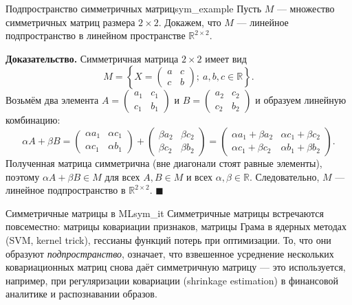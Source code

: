 \documentclass[12pt,a4paper]{article}
\newenvironment{myproof}{\noindent\textbf{Доказательство.}}{\hfill$\blacksquare$}
\begin{document}
\begin{definition}{Подпространство симметричных матриц}{sym_example}
Пусть $M$ — множество симметричных матриц размера $2 \times 2$.
Докажем, что $M$ — линейное подпространство в линейном пространстве
$\mathbb{R}^{2\times 2}$.
\end{definition}

\begin{myproof}
Симметричная матрица $2\times 2$ имеет вид
\[
M = \left\{ X =
\begin{pmatrix} a & c \\ c & b
\end{pmatrix};\
a, b, c \in \mathbb{R} \right\}.
\]
Возьмём два элемента
$A =
\begin{pmatrix} a_1 & c_1 \\ c_1 & b_1
\end{pmatrix}$ и
$B =
\begin{pmatrix} a_2 & c_2 \\ c_2 & b_2
\end{pmatrix}$ и образуем
линейную комбинацию:
\[
\alpha A + \beta B
=
\begin{pmatrix} \alpha a_1 & \alpha c_1 \\ \alpha c_1 & \alpha b_1
\end{pmatrix}
+
\begin{pmatrix} \beta a_2 & \beta c_2 \\ \beta c_2 & \beta b_2
\end{pmatrix}
=
\begin{pmatrix}
\alpha a_1 + \beta a_2 & \alpha c_1 + \beta c_2 \\
\alpha c_1 + \beta c_2 & \alpha b_1 + \beta b_2
\end{pmatrix}.
\]
Полученная матрица симметрична (вне диагонали стоят равные элементы),
поэтому $\alpha A + \beta B \in M$ для всех $A, B \in M$ и всех
$\alpha, \beta \in \mathbb{R}$. Следовательно, $M$ — линейное
подпространство в $\mathbb{R}^{2\times 2}$.
\end{myproof}

\begin{remarkIT}{Симметричные матрицы в ML}{sym_it}
Симметричные матрицы встречаются повсеместно: матрицы ковариации
признаков, матрицы Грама в ядерных методах (SVM, kernel trick),
гессианы функций потерь при оптимизации. То, что они образуют
\emph{подпространство}, означает, что взвешенное усреднение нескольких
ковариационных матриц снова даёт симметричную матрицу — это
используется, например, при регуляризации ковариации
(shrinkage estimation) в финансовой аналитике и распознавании образов.
\end{remarkIT}
\end{document}

